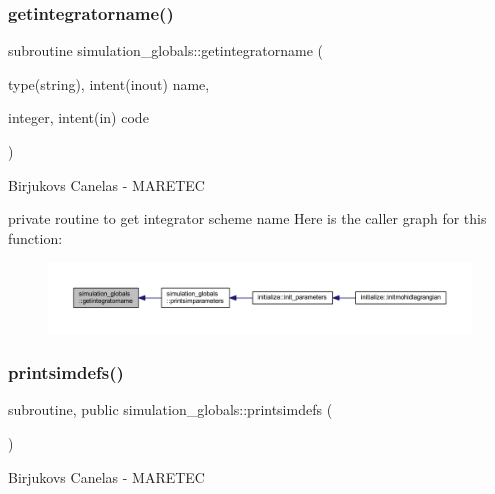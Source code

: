 \subsubsection{\texorpdfstring{getintegratorname()}{getintegratorname()}}
{\footnotesize\ttfamily subroutine simulation\+\_\+globals\+::getintegratorname (\begin{DoxyParamCaption}\item[{type(string), intent(inout)}]{name,  }\item[{integer, intent(in)}]{code }\end{DoxyParamCaption})\hspace{0.3cm}{\ttfamily [private]}}



Birjukovs Canelas -\/ M\+A\+R\+E\+T\+EC 

private routine to get integrator scheme name Here is the caller graph for this function\+:
\nopagebreak
\begin{figure}[H]
\begin{center}
\leavevmode
\includegraphics[width=350pt]{namespacesimulation__globals_a2c6bf88542c503d1da58280ab3dcf772_icgraph}
\end{center}
\end{figure}
\mbox{\label{namespacesimulation__globals_a1683e8f5cab2101e7e3dbc91108b64a3}} 
\subsubsection{\texorpdfstring{printsimdefs()}{printsimdefs()}}
{\footnotesize\ttfamily subroutine, public simulation\+\_\+globals\+::printsimdefs (\begin{DoxyParamCaption}{ }\end{DoxyParamCaption})}



Birjukovs Canelas -\/ M\+A\+R\+E\+T\+EC 

